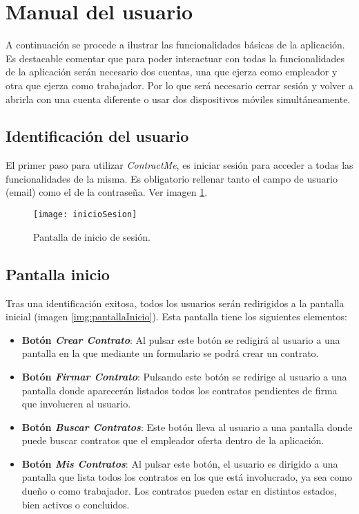 \section{Manual del usuario}

A continuación se procede a ilustrar las funcionalidades básicas de la aplicación. Es destacable comentar que para poder interactuar con todas la funcionalidades de la aplicación serán necesario dos cuentas, una que ejerza como empleador y otra que ejerza como trabajador. Por lo que será necesario cerrar sesión y volver a abrirla con una cuenta diferente o usar dos dispositivos móviles simultáneamente.

\subsection{Identificación del usuario}

El primer paso para utilizar \textit{ContractMe}, es iniciar sesión para acceder a todas las funcionalidades de la misma. Es obligatorio rellenar tanto el campo de usuario (email) como el de la contraseña.
Ver imagen \ref{img:inicioSesion}.

\begin{figure}[h]
	\label{img:inicioSesion}
	\centering
	\texttt{[image: inicioSesion]}
	\caption[Pantalla inicio sesión]{Pantalla de inicio de sesión.}
\end{figure}

\subsection{Pantalla inicio}

Tras una identificación exitosa, todos los usuarios serán redirigidos a la pantalla inicial (imagen \ref{img:pantallaInicio}). Esta pantalla tiene los siguientes elementos:

\begin{itemize}

\item \textbf{Botón \textit{Crear Contrato}}: Al pulsar este botón se redigirá al usuario a una pantalla en la que mediante un formulario se podrá crear un contrato.

\item \textbf{Botón \textit{Firmar Contrato}}: Pulsando este botón se redirige al usuario a una pantalla donde aparecerán listados todos los contratos pendientes de firma que involucren al usuario.

\item \textbf{Botón \textit{Buscar Contratos}}: Este botón lleva al usuario a una pantalla donde puede buscar contratos que el empleador oferta dentro de la aplicación. 

\item \textbf{Botón \textit{Mis Contratos}}: Al pulsar este botón, el usuario es dirigido a una pantalla que lista todos los contratos en los que está involucrado, ya sea como dueño o como trabajador.
Los contratos pueden estar en distintos estados, bien activos o concluidos.

\end{itemize}

